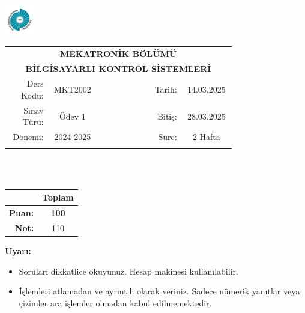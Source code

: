 \newcommand\UniversiteAdi{Niğde Ömer Halisdemir Üniversitesi}
\newcommand\BolumAdi{MEKATRONİK BÖLÜMÜ}
\newcommand\DersKodu{MKT2002}
\newcommand\DersAdi{BİLGİSAYARLI KONTROL SİSTEMLERİ}
\newcommand\SinavAdi{Ödev 1}
\newcommand\SinavTarihi{14.03.2025}
\newcommand\SinavSaati{28.03.2025}
\newcommand\SinavSuresi{2 Hafta}

\pagestyle{fancy}
\fancyhf{} %
\noindent \includegraphics[width=0.1\textwidth]{logo}
\begin{tabular}{
    p{0.15\linewidth}
    p{0.15\linewidth}
    p{0.2\linewidth}
    p{0.1\linewidth}
    p{0.15\linewidth}}
    \multicolumn{5}{c}{\textbf{\BolumAdi}}\\
    \multicolumn{5}{c}{\textbf{\DersAdi}}\\\hline
    \multicolumn{1}{|r|}{Ders Kodu:}&
    \multicolumn{1}{|c|}{\DersKodu}&
    \multicolumn{1}{|c|}{}& 
    \multicolumn{1}{|r|}{Tarih:}&
    \multicolumn{1}{|c|}{\SinavTarihi} \\\hline
    \multicolumn{1}{|r|}{Sınav Türü:}&
    \multicolumn{1}{|c|}{\SinavAdi}&  
    \multicolumn{1}{|c|}{}&
    \multicolumn{1}{|r|}{Bitiş:}&
    \multicolumn{1}{|c|}{\SinavSaati}\\\hline
    \multicolumn{1}{|r|}{Dönemi:}&
    \multicolumn{1}{|c|}{2024-2025}&
    \multicolumn{1}{|c|}{}&
    \multicolumn{1}{|r|}{Süre:}&
    \multicolumn{1}{|c|}{\SinavSuresi} \\\hline
    &&&&\\
\end{tabular}\\\\
\noindent\begin{center}
\begin{tabular}{|r|c|}\hline
    &\textbf{Toplam}\\\hline
    \textbf{Puan:} &\textbf{100}\\\hline
    \textbf{Not:}  &110\\\hline
\end{tabular}\end{center}
\noindent\textbf{Uyarı:}
\begin{itemize}\bfseries
    \item Soruları dikkatlice okuyunuz. Hesap makinesi kullanılabilir.
    \item İşlemleri atlamadan ve ayrıntılı olarak veriniz. Sadece nümerik yanıtlar veya çizimler ara işlemler olmadan kabul edilmemektedir.
\end{itemize}
